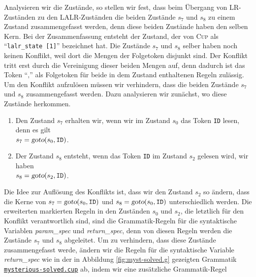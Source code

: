 Analysieren wir die Zust\"ande, so stellen wir fest, dass beim \"Ubergang von LR-Zust\"anden zu den
LALR-Zust\"anden die beiden Zust\"ande $s_7$ und $s_8$ zu einem Zustand zusammengefasst werden, denn diese
beiden Zust\"ande haben den selben Kern.  Bei der Zusammenfassung entsteht der Zustand, der von
\textsc{Cup} als ``\texttt{lalr\_state [1]}'' bezeichnet hat.  Die Zust\"ande $s_7$ und $s_8$ selber haben
noch keinen Konflikt, weil dort die Mengen der Folgetoken disjunkt sind.  Der Konflikt tritt erst durch
die Vereinigung dieser beiden Mengen auf, denn dadurch ist das Token ``$\texttt{,}$'' als Folgetoken f\"ur
beide in dem Zustand enthaltenen Regeln zul\"assig.   Um den Konflikt aufzul\"osen m\"ussen wir verhindern, dass
die beiden Zust\"ande $s_7$ und $s_8$ zusammengefasst werden.  Dazu analysieren wir zun\"achst, wo diese
Zust\"ande herkommen.
\begin{enumerate}
\item Den Zustand $s_7$ erhalten wir, wenn wir im Zustand $s_0$ das Token \texttt{ID} lesen, denn
      es gilt 
      \\[0.2cm]
      \hspace*{1.3cm}
      $s_7 = \textsl{goto}(s_0, \mathtt{ID})$.
\item Der Zustand $s_8$ entsteht, wenn das Token \texttt{ID} im Zustand $s_2$ gelesen wird, wir haben
      \\[0.2cm]
      \hspace*{1.3cm}
      $s_8 = \textsl{goto}(s_2, \mathtt{ID})$.
\end{enumerate}
Die Idee zur Aufl\"osung des Konflikts ist, dass wir den Zustand $s_2$ so \"andern, dass die Kerne von
$s_7 = \textsl{goto}(s_0, \mathtt{ID})$ und $s_8 = \textsl{goto}(s_0, \mathtt{ID})$ unterschiedlich werden.  
Die erweiterten markierten Regeln in den Zust\"anden $s_0$ und $s_2$, die letztlich f\"ur den Konflikt verantwortlich
sind, sind die Grammatik-Regeln f\"ur die syntaktische Variablen \textsl{param\_spec} und
\textsl{return\_spec}, denn von diesen Regeln werden die  Zust\"ande $s_7$ und $s_8$ abgeleitet.
Um zu verhindern, dass diese Zust\"ande zusammengefasst werde, \"andern wir die Regeln f\"ur die
syntaktische Variable \textsl{return\_spec} wie in der in Abbildung \ref{fig:myst-solved.g}
gezeigten Grammatik
\href{https://github.com/karlstroetmann/Formal-Languages/tree/master/Cup/MysteriousConflict/mysterious-solved.cup}{\texttt{mysterious-solved.cup}}
 ab,
indem wir eine zus\"atzliche Grammatik-Regel 
\\[0.2cm]
\hspace*{1.3cm}

